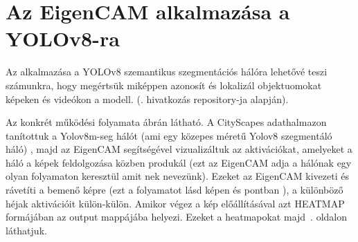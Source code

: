 \documentclass[12pt,oneside,a4paper]{article}
\newcommand{\newsection}[1]{\clearpage\section{#1}}\label{makro}
\theoremstyle{remark}
\begin{document}
\newsection{Az EigenCAM alkalmazása a YOLOv8-ra}\label{sec:az-eigencam-alkalmazasa-a-yolov8-ra}
    Az  alkalmazása a YOLOv8 szemantikus szegmentációs hálóra lehetővé teszi számunkra,
     hogy megértsük miképpen azonosít és lokalizál objektuomokat képeken és videókon a modell.
    (\cite{YoloV8-CAM}. hivatkozás repository-ja alapján).

    Az  konkrét működési folyamata \label{abrahiv} ábrán látható.
    A CityScapes adathalmazon tanítottuk a Yolov8m-seg hálót (ami egy közepes méretű Yolov8 szegmentáló háló)
    , majd az EigenCAM segítségével vizualizáltuk az aktivációkat,
    amelyeket a háló a képek feldolgozása közben produkál (ezt az EigenCAM adja a hálónak egy olyan folyamaton keresztül
    amit nek nevezünk).
    Ezeket az EigenCAM kivezeti és rávetíti a bemenő képre (ezt a folyamatot lásd
     képen és pontban \label{listahiv} ), a különböző
    héjak aktivációit külön-külön.
    Amikor végez a kép előállításával azt HEATMAP formájában az output mappájába helyezi.
    Ezeket a heatmapokat majd~\pageref{sec:magyarazhatosagi-eredmenyek-es-ertekeles}. oldalon láthatjuk.
\end{document}
